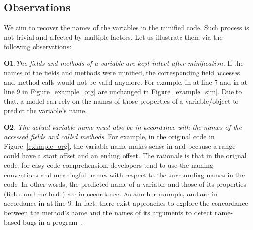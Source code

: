 \subsection{Observations}



We aim to recover the names of the variables in the minified
code. Such process is not trivial and affected by multiple factors.
Let us illustrate them via the following observations:






\textbf{O1}.{\em The fields and methods of a variable are kept intact
  after minification.} If the names of the fields and methods were
minified, the corresponding field accesses and method calls would not
be valid anymore. For example,  in
 at line 7 and  in
 at line 9 in Figure~\ref{example_org} are
unchanged in Figure~\ref{example_sim}. Due to that, a model can rely
on the names of those properties of a variable/object to predict the
variable's name.

\textbf{O2}. {\em The actual variable name must also be in accordance
  with the names of the accessed fields and called methods}. For
example, in the original code in Figure~\ref{example_org}, the
variable name  makes sense in  and
 because a range could have a start offset and
an ending offset. The rationale is that in the orignal code, for easy
code comprehension, developers tend to use the naming conventions and
meaningful names with respect to the surrounding names in the code. In
other words, the predicted name of a variable and those of its
properties (fields and methods) are in accordance. As another example,
 and  are in accordance in
 at line 9. In fact, there exist
approaches to explore the concordance between the method's name and
the names of its arguments to detect name-based bugs in a
program~\cite{deepbugs-oopsla18}.

